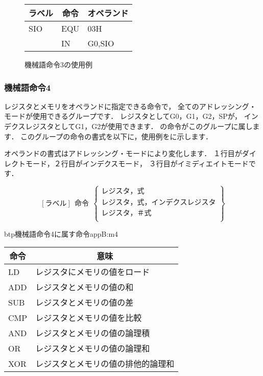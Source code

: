 \begin{figure}[btp]
\begin{center}
{\tt\small\begin{tabular}{|l|l|l|}\hline
\multicolumn{1}{|c|}{ラベル} & 
        \multicolumn{1}{c|}{命令} & \multicolumn{1}{c|}{オペランド} \\\hline
SIO  & EQU &  03H \\
     & IN  &  G0,SIO \\\hline
\end{tabular}}
\caption{機械語命令3の使用例}
\label{fig:appB:m3ex}
\end{center}
\end{figure}

\subsubsection{機械語命令4}
レジスタとメモリをオペランドに指定できる命令で，
全てのアドレッシング・モードが使用できるグループです．
レジスタとしてG0，G1，G2，SPが，
インデクスレジスタとしてG1，G2が使用できます．
の命令がこのグループに属します．
このグループの命令の書式を以下に，使用例をに示します．

オペランドの書式はアドレッシング・モードにより変化します．
１行目がダイレクトモード，２行目がインデクスモード，
３行目がイミディエイトモードです．

{\small\[ %
[ラベル]~~命令~~\left\{
  \begin{array}{c}
   レジスタ，式 \\
   レジスタ，式，インデクスレジスタ \\
   レジスタ，＃式 \\
  \end{array}  
 \right\}
 \]}

\begin{mytable}{btp}{機械語命令4に属す命令}{appB:m4}
{\small\begin{tabular}{l|l}
\hline\hline
\multicolumn{1}{c|}{命令} & \multicolumn{1}{c}{意味} \\\hline
LD & レジスタにメモリの値をロード \\
ADD & レジスタとメモリの値の和 \\
SUB & レジスタとメモリの値の差 \\
CMP & レジスタとメモリの値を比較 \\
AND & レジスタとメモリの値の論理積 \\
OR & レジスタとメモリの値の論理和 \\
XOR & レジスタとメモリの値の排他的論理和
\end{tabular}}
\end{mytable}

